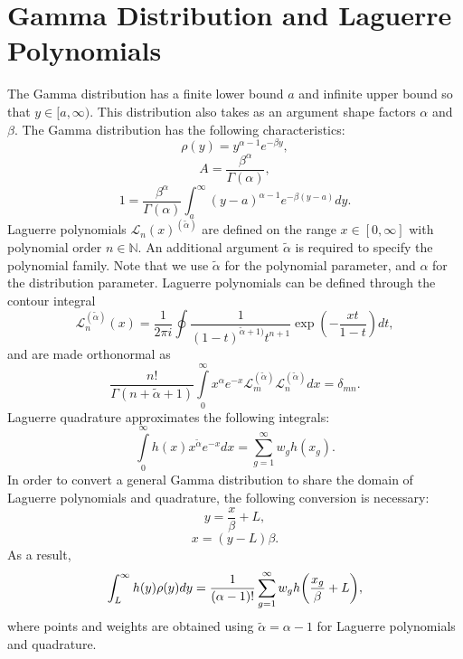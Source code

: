 \section{Gamma Distribution and Laguerre Polynomials}
The Gamma distribution has a finite lower bound $a$ and infinite upper bound so that $y\in[a,\infty)$.
This distribution also takes as an argument shape factors $\alpha$ and $\beta$.
The Gamma distribution has the following characteristics:
\begin{equation}
  \rho(y) = y^{\alpha-1}e^{-\beta y},
\end{equation}
\begin{equation}
  A = \frac{\beta^\alpha}{\Gamma(\alpha)},
\end{equation}
\begin{equation}
  1 = \frac{\beta^\alpha}{\Gamma(\alpha)}\int_a^\infty (y-a)^{\alpha-1}e^{-\beta (y-a)} dy.
\end{equation}
Laguerre polynomials $\mathcal{L}_n(x)^{(\tilde\alpha)}$ are defined on the range $x\in[0,\infty]$ with polynomial order
$n\in\mathbb{N}$.  An additional argument $\tilde\alpha$ is required to specify the polynomial family.
Note that we use $\tilde\alpha$ for the polynomial parameter, and $\alpha$ for the distribution parameter.
Laguerre polynomials can be defined through the contour integral \cite{polys}
\begin{equation}
  \mathcal{L}_n^{(\tilde\alpha)}(x) = \frac{1}{2\pi i}\oint\frac{1}{(1-t)^{\tilde\alpha+1)}t^{n+1}} 
      \exp(-\frac{xt}{1-t}) dt,
\end{equation}
and are made orthonormal as
\begin{equation}
  \frac{n!}{\Gamma(n+\tilde\alpha+1)}\int\limits_0^\infty x^\alpha e^{-x}
          \mathcal{L}_m^{(\tilde\alpha)}\mathcal{L}_n^{(\tilde\alpha)} dx = \delta_{mn}.
\end{equation}
Laguerre quadrature approximates the following integrals:
\begin{equation}
  \int\limits_0^\infty h(x) x^{\tilde\alpha} e^{-x} dx = \sum_{g=1}^\infty w_g h(x_g).
\end{equation}
In order to convert a general Gamma distribution to share the domain of Laguerre polynomials and quadrature,
the following conversion is necessary:
\begin{equation}
  y = \frac{x}{\beta}+L,
\end{equation}
\begin{equation}
  x = (y-L)\beta.
\end{equation}
As a result,
\begin{equation}
  \int_{L}^\infty h(y)\rho(y)dy =\frac{1}{(\alpha-1)!} \sum_{g=1}^\infty w_g h\qty(\frac{x_g}{\beta}+L),
\end{equation}
where points and weights are obtained using $\tilde\alpha = \alpha-1$ for Laguerre polynomials and quadrature.



